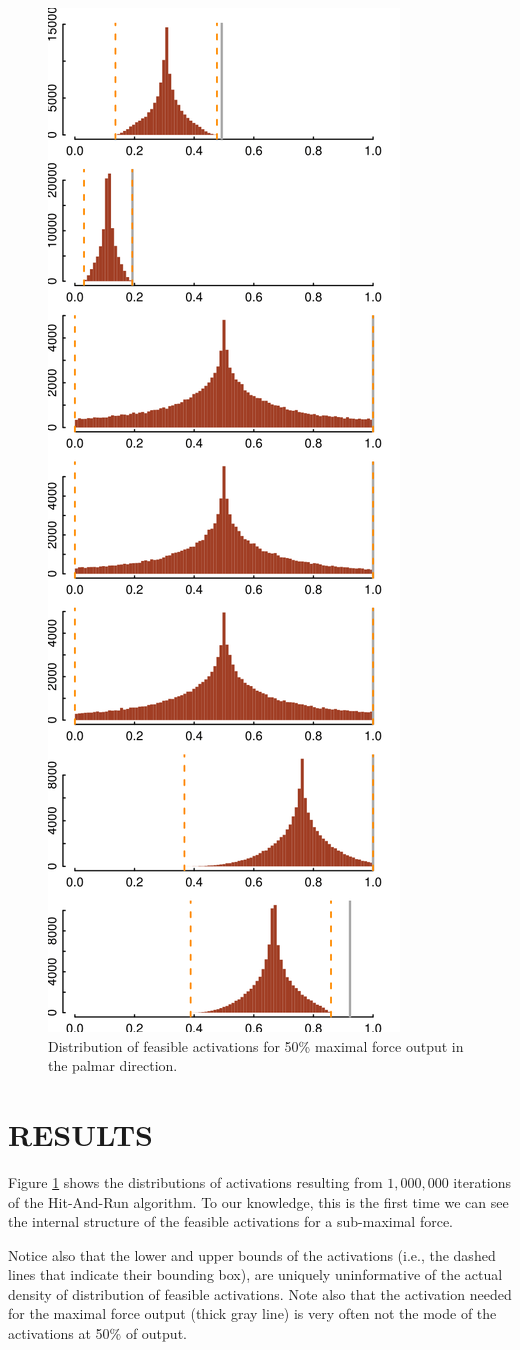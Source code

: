 \begin{figure}[htbp]
\centering
\includegraphics[width=7.5cm\textwidth]{sections/figs/raw_histograms.png}
\caption{Distribution of feasible activations for 50\% maximal force output in the palmar direction.}
\label{fig:raw_histograms}
\end{figure}


\section{RESULTS}

Figure \ref{fig:raw_histograms} shows the distributions of activations resulting from $1,000,000$ iterations of the Hit-And-Run algorithm. To our knowledge, this is the first time we can see the internal structure of the feasible activations for a sub-maximal force.

Notice also that the lower and upper bounds of the activations (i.e., the dashed lines that indicate their bounding box), are uniquely uninformative of the actual density of distribution of feasible activations. Note also that the activation needed for the maximal force output (thick gray line) is very often not the mode of the activations at 50\% of output.

